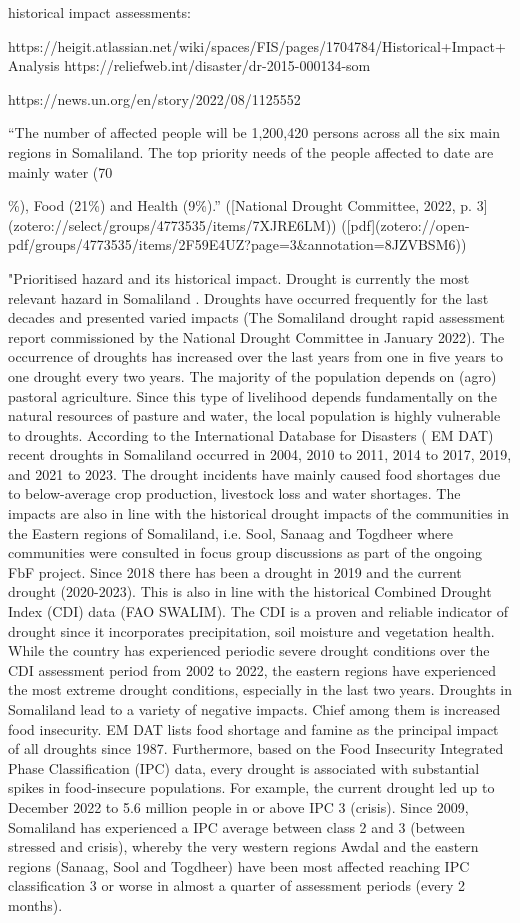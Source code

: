 {historical impact assessments:

https://heigit.atlassian.net/wiki/spaces/FIS/pages/1704784/Historical+Impact+Analysis
https://reliefweb.int/disaster/dr-2015-000134-som


https://news.un.org/en/story/2022/08/1125552

“The number of affected people will be 1,200,420 persons across all the six main regions in Somaliland. The top priority needs of the people affected to date are mainly water (70{\%), Food (21\%) and Health (9\%).” ([National Drought Committee, 2022, p. 3](zotero://select/groups/4773535/items/7XJRE6LM)) ([pdf](zotero://open-pdf/groups/4773535/items/2F59E4UZ?page=3&annotation=8JZVBSM6))


"Prioritised hazard and its historical impact.
Drought is currently the most relevant hazard in Somaliland . Droughts have occurred frequently for the last decades and presented varied impacts (The Somaliland drought rapid assessment report commissioned by the National Drought Committee in January 2022).  The occurrence of droughts has increased over the last years from one in five years to one drought every two years. The majority of the population depends on (agro) pastoral agriculture. Since this type of livelihood depends fundamentally on the natural resources of pasture and water, the local population is highly vulnerable to droughts. 
According to the International Database for Disasters ( EM DAT) recent droughts in Somaliland occurred in 2004, 2010 to 2011, 2014 to 2017, 2019, and 2021 to 2023. The drought incidents have mainly caused food shortages due to below-average crop production, livestock loss and water shortages. The impacts are also in line with the historical drought impacts of the communities in the Eastern regions of Somaliland, i.e. Sool, Sanaag and Togdheer where communities were consulted in focus group discussions as part of the ongoing FbF project.  Since 2018 there has been a drought in 2019 and the current drought (2020-2023). This is also in line with the historical Combined Drought Index (CDI) data (FAO SWALIM). The CDI is a proven and reliable indicator of drought since it incorporates precipitation, soil moisture and vegetation health. While the country has experienced periodic severe drought conditions over the CDI assessment period from 2002 to 2022, the eastern regions have experienced the most extreme drought conditions, especially in the last two years. Droughts in Somaliland lead to a variety of negative impacts. Chief among them is increased food insecurity. EM DAT  lists food shortage and famine as the principal impact of all droughts since 1987. Furthermore, based on the Food Insecurity Integrated Phase Classification (IPC) data, every drought is associated with substantial spikes in food-insecure populations. For example, the current drought led up to December 2022 to 5.6 million people in or above IPC 3 (crisis). Since 2009, Somaliland has experienced a IPC average between class 2 and 3 (between stressed and crisis), whereby the very western regions Awdal and the eastern regions (Sanaag, Sool and Togdheer) have been most affected reaching IPC classification 3 or worse in almost a quarter of assessment periods (every 2 months). 
}}
